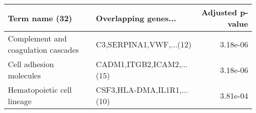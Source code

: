 \begin{tabular}{llr}
\toprule
                     Term name (32) &       Overlapping genes... &  Adjusted p-value \\
\midrule
Complement and coagulation cascades &    C3,SERPINA1,VWF,...(12) &          3.18e-06 \\
            Cell adhesion molecules &  CADM1,ITGB2,ICAM2,...(15) &          3.18e-06 \\
         Hematopoietic cell lineage & CSF3,HLA-DMA,IL1R1,...(10) &          3.81e-04 \\
\bottomrule
\end{tabular}
